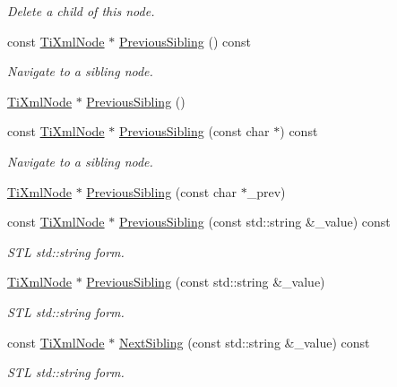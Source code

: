 \begin{DoxyCompactItemize}
\begin{DoxyCompactList}\small\item\em Delete a child of this node. \end{DoxyCompactList}\item 
const \hyperlink{class_ti_xml_node}{Ti\+Xml\+Node} $\ast$ \hyperlink{class_ti_xml_node_a8aacf06b1a577ff0d7cfa502cc76da32}{Previous\+Sibling} () const
\begin{DoxyCompactList}\small\item\em Navigate to a sibling node. \end{DoxyCompactList}\item 
\hyperlink{class_ti_xml_node}{Ti\+Xml\+Node} $\ast$ \hyperlink{class_ti_xml_node_af8c0642ad6ecc03f62953e68896ed1cc}{Previous\+Sibling} ()
\item 
const \hyperlink{class_ti_xml_node}{Ti\+Xml\+Node} $\ast$ \hyperlink{class_ti_xml_node_ace1b618fe58b2b9305fe89bfbc8dd17b}{Previous\+Sibling} (const char $\ast$) const
\begin{DoxyCompactList}\small\item\em Navigate to a sibling node. \end{DoxyCompactList}\item 
\hyperlink{class_ti_xml_node}{Ti\+Xml\+Node} $\ast$ \hyperlink{class_ti_xml_node_a6c977049207177ef21b51972315c2053}{Previous\+Sibling} (const char $\ast$\+\_\+prev)
\item 
const \hyperlink{class_ti_xml_node}{Ti\+Xml\+Node} $\ast$ \hyperlink{class_ti_xml_node_a64ee1c722b607040cd02bd0fd05eb04a}{Previous\+Sibling} (const std\+::string \&\+\_\+value) const
\begin{DoxyCompactList}\small\item\em S\+TL std\+::string form. \end{DoxyCompactList}\item 
\hyperlink{class_ti_xml_node}{Ti\+Xml\+Node} $\ast$ \hyperlink{class_ti_xml_node_acc8a0434c7f401d4a3b6dee77c1a5912}{Previous\+Sibling} (const std\+::string \&\+\_\+value)
\begin{DoxyCompactList}\small\item\em S\+TL std\+::string form. \end{DoxyCompactList}\item 
const \hyperlink{class_ti_xml_node}{Ti\+Xml\+Node} $\ast$ \hyperlink{class_ti_xml_node_a5f0bf3809d4a35456d28cc9522c26245}{Next\+Sibling} (const std\+::string \&\+\_\+value) const
\begin{DoxyCompactList}\small\item\em S\+TL std\+::string form. \end{DoxyCompactList}\item 

\end{DoxyCompactItemize}
